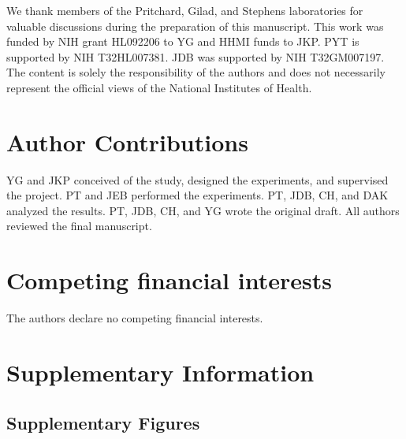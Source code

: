 We thank members of the Pritchard, Gilad, and Stephens laboratories for
valuable discussions during the preparation of this manuscript. This
work was funded by NIH grant HL092206 to YG and HHMI funds to JKP. PYT
is supported by NIH T32HL007381. JDB was supported by NIH T32GM007197.
The content is solely the responsibility of the authors and does not
necessarily represent the official views of the National Institutes of
Health.

\section{Author Contributions}\label{ch04-author-contributions}

YG and JKP conceived of the study, designed the experiments, and
supervised the project. PT and JEB performed the experiments. PT, JDB,
CH, and DAK analyzed the results. PT, JDB, CH, and YG wrote the original
draft. All authors reviewed the final manuscript.

\section{Competing financial
interests}\label{ch04-competing-financial-interests}

The authors declare no competing financial interests.

\clearpage
\section{Supplementary Information}\label{ch04-supplementary-information}

\subsection{Supplementary Figures}\label{ch04-supplementary-figures}

